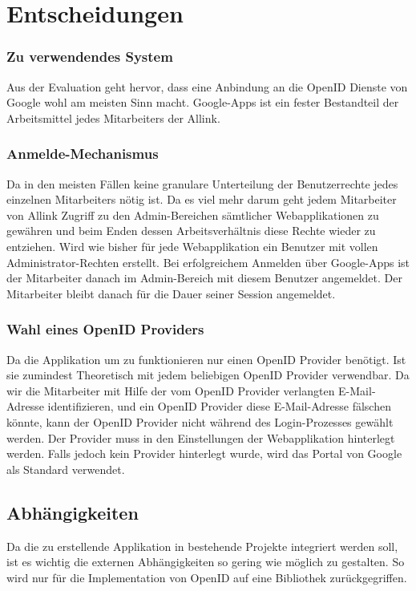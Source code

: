 \section{Entscheidungen}
\label{sec:Entscheidungen}

\subsubsection{Zu verwendendes System}
\label{ssub:Zu verwendendes System}
Aus der Evaluation geht hervor, dass eine Anbindung an die OpenID Dienste von
Google wohl am meisten Sinn macht. Google-Apps ist ein fester Bestandteil der
Arbeitsmittel jedes Mitarbeiters der Allink.

\subsubsection{Anmelde-Mechanismus}
\label{ssub:Anmelde-Mechanismus}
Da in den meisten Fällen keine granulare Unterteilung der Benutzerrechte jedes
einzelnen Mitarbeiters nötig ist. Da es viel mehr darum geht jedem Mitarbeiter
von Allink Zugriff zu den Admin-Bereichen sämtlicher Webapplikationen zu
gewähren und beim Enden dessen Arbeitsverhältnis diese Rechte wieder zu
entziehen. Wird wie bisher für jede Webapplikation ein Benutzer mit vollen
Administrator-Rechten erstellt. Bei erfolgreichem Anmelden über Google-Apps ist
der Mitarbeiter danach im Admin-Bereich mit diesem Benutzer angemeldet. Der
Mitarbeiter bleibt danach für die Dauer seiner Session angemeldet.

\subsubsection{Wahl eines OpenID Providers}
\label{ssub:Wahl eines OpenID Providers}
Da die Applikation um zu funktionieren nur einen OpenID Provider benötigt. Ist
sie zumindest Theoretisch mit jedem beliebigen OpenID Provider verwendbar. Da
wir die Mitarbeiter mit Hilfe der vom OpenID Provider verlangten E-Mail-Adresse
identifizieren, und ein OpenID Provider diese E-Mail-Adresse fälschen könnte,
kann der OpenID Provider nicht während des Login-Prozesses gewählt werden. Der
Provider muss in den Einstellungen der Webapplikation hinterlegt werden. Falls
jedoch kein Provider hinterlegt wurde, wird das Portal von Google als Standard
verwendet.

\subsection{Abhängigkeiten}
\label{sub:Abhängigkeiten}
Da die zu erstellende Applikation in bestehende Projekte integriert werden soll,
ist es wichtig die externen Abhängigkeiten so gering wie möglich zu gestalten.
So wird nur für die Implementation von OpenID auf eine Bibliothek
zurückgegriffen.

